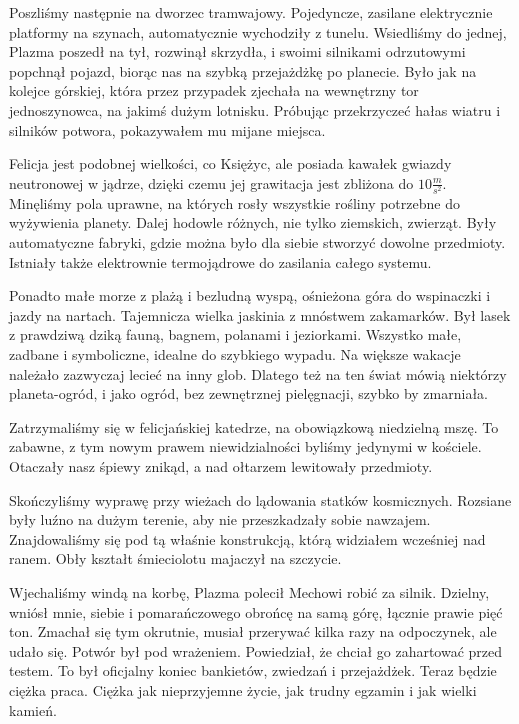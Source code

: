 Poszliśmy następnie na dworzec tramwajowy. Pojedyncze, zasilane elektrycznie platformy na szynach, automatycznie wychodziły z tunelu.
Wsiedliśmy do jednej, Plazma poszedł na tył, rozwinął skrzydła, i swoimi silnikami odrzutowymi popchnął pojazd, biorąc nas na szybką przejażdżkę po planecie.
Było jak na kolejce górskiej, która przez przypadek zjechała na wewnętrzny tor jednoszynowca, na jakimś dużym lotnisku.
Próbując przekrzyczeć hałas wiatru i silników potwora, pokazywałem mu mijane miejsca.

Felicja jest podobnej wielkości, co Księżyc, ale posiada kawałek gwiazdy neutronowej w jądrze, dzięki czemu jej grawitacja jest zbliżona do $10 \frac{m}{s^2}$.
Minęliśmy pola uprawne, na których rosły wszystkie rośliny potrzebne do wyżywienia planety.
Dalej hodowle różnych, nie tylko ziemskich, zwierząt.
Były automatyczne fabryki, gdzie można było dla siebie stworzyć dowolne przedmioty.
Istniały także elektrownie termojądrowe do zasilania całego systemu.

Ponadto małe morze z plażą i bezludną wyspą, ośnieżona góra do wspinaczki i jazdy na nartach.
Tajemnicza wielka jaskinia z mnóstwem zakamarków.
Był lasek z prawdziwą dziką fauną, bagnem, polanami i jeziorkami.
Wszystko małe, zadbane i symboliczne, idealne do szybkiego wypadu.
Na większe wakacje należało zazwyczaj lecieć na inny glob.
Dlatego też na ten świat mówią niektórzy planeta-ogród, i jako ogród, bez zewnętrznej pielęgnacji, szybko by zmarniała.

Zatrzymaliśmy się w felicjańskiej katedrze, na obowiązkową niedzielną mszę.
To zabawne, z tym nowym prawem niewidzialności byliśmy jedynymi w kościele. 
Otaczały nasz śpiewy znikąd, a nad ołtarzem lewitowały przedmioty.

Skończyliśmy wyprawę przy wieżach do lądowania statków kosmicznych.
Rozsiane były luźno na dużym terenie, aby nie przeszkadzały sobie nawzajem.
Znajdowaliśmy się pod tą właśnie konstrukcją, którą widziałem wcześniej nad ranem.
Obły kształt śmieciolotu majaczył na szczycie.

Wjechaliśmy windą na korbę, Plazma polecił Mechowi robić za silnik.
Dzielny, wniósł mnie, siebie i pomarańczowego obrońcę na samą górę, łącznie prawie pięć ton. 
Zmachał się tym okrutnie, musiał przerywać kilka razy na odpoczynek, ale udało się.
Potwór był pod wrażeniem. Powiedział, że chciał go zahartować przed testem. 
To był oficjalny koniec bankietów, zwiedzań i przejażdżek. Teraz będzie ciężka praca.
Ciężka jak nieprzyjemne życie, jak trudny egzamin i jak wielki kamień.

